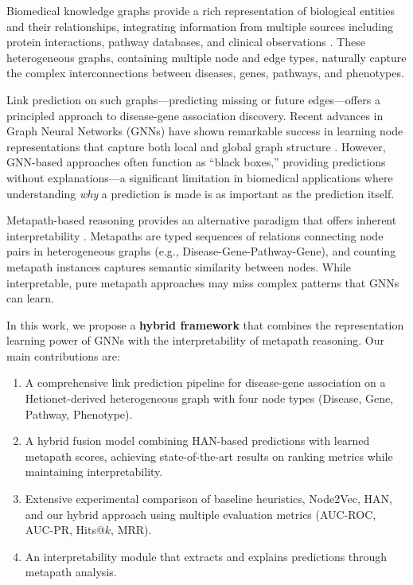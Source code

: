 \documentclass[11pt]{article}
\begin{document}
Biomedical knowledge graphs provide a rich representation of biological entities and their relationships, integrating information from multiple sources including protein interactions, pathway databases, and clinical observations \citep{himmelstein2017systematic}. These heterogeneous graphs, containing multiple node and edge types, naturally capture the complex interconnections between diseases, genes, pathways, and phenotypes.

Link prediction on such graphs---predicting missing or future edges---offers a principled approach to disease-gene association discovery. Recent advances in Graph Neural Networks (GNNs) have shown remarkable success in learning node representations that capture both local and global graph structure \citep{hamilton2020graph}. However, GNN-based approaches often function as ``black boxes,'' providing predictions without explanations---a significant limitation in biomedical applications where understanding \emph{why} a prediction is made is as important as the prediction itself.

Metapath-based reasoning provides an alternative paradigm that offers inherent interpretability \citep{sun2011pathsim}. Metapaths are typed sequences of relations connecting node pairs in heterogeneous graphs (e.g., Disease-Gene-Pathway-Gene), and counting metapath instances captures semantic similarity between nodes. While interpretable, pure metapath approaches may miss complex patterns that GNNs can learn.

In this work, we propose a \textbf{hybrid framework} that combines the representation learning power of GNNs with the interpretability of metapath reasoning. Our main contributions are:

\begin{enumerate}
    \item A comprehensive link prediction pipeline for disease-gene association on a Hetionet-derived heterogeneous graph with four node types (Disease, Gene, Pathway, Phenotype).

    \item A hybrid fusion model combining HAN-based predictions with learned metapath scores, achieving state-of-the-art results on ranking metrics while maintaining interpretability.

    \item Extensive experimental comparison of baseline heuristics, Node2Vec, HAN, and our hybrid approach using multiple evaluation metrics (AUC-ROC, AUC-PR, Hits@$k$, MRR).

    \item An interpretability module that extracts and explains predictions through metapath analysis.
\end{enumerate}
\end{document}
